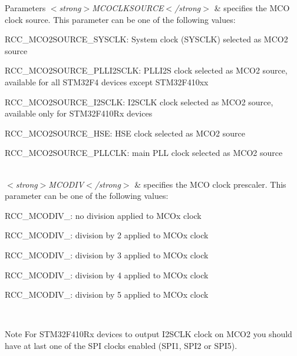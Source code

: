 \begin{DoxyParams}{Parameters}
{\em $<$strong$>$\+M\+C\+O\+C\+L\+K\+S\+O\+U\+R\+C\+E$<$/strong$>$} & specifies the M\+CO clock source. This parameter can be one of the following values\+: \begin{DoxyItemize}
\item R\+C\+C\+\_\+\+M\+C\+O2\+S\+O\+U\+R\+C\+E\+\_\+\+S\+Y\+S\+C\+LK\+: System clock (S\+Y\+S\+C\+LK) selected as M\+C\+O2 source \item R\+C\+C\+\_\+\+M\+C\+O2\+S\+O\+U\+R\+C\+E\+\_\+\+P\+L\+L\+I2\+S\+C\+LK\+: P\+L\+L\+I2S clock selected as M\+C\+O2 source, available for all S\+T\+M32\+F4 devices except S\+T\+M32\+F410xx \item R\+C\+C\+\_\+\+M\+C\+O2\+S\+O\+U\+R\+C\+E\+\_\+\+I2\+S\+C\+LK\+: I2\+S\+C\+LK clock selected as M\+C\+O2 source, available only for S\+T\+M32\+F410\+Rx devices \item R\+C\+C\+\_\+\+M\+C\+O2\+S\+O\+U\+R\+C\+E\+\_\+\+H\+SE\+: H\+SE clock selected as M\+C\+O2 source \item R\+C\+C\+\_\+\+M\+C\+O2\+S\+O\+U\+R\+C\+E\+\_\+\+P\+L\+L\+C\+LK\+: main P\+LL clock selected as M\+C\+O2 source \end{DoxyItemize}
\\
\hline
{\em $<$strong$>$\+M\+C\+O\+D\+I\+V$<$/strong$>$} & specifies the M\+CO clock prescaler. This parameter can be one of the following values\+: \begin{DoxyItemize}
\item R\+C\+C\+\_\+\+M\+C\+O\+D\+I\+V\+\_\+: no division applied to M\+C\+Ox clock \item R\+C\+C\+\_\+\+M\+C\+O\+D\+I\+V\+\_\+: division by 2 applied to M\+C\+Ox clock \item R\+C\+C\+\_\+\+M\+C\+O\+D\+I\+V\+\_\+: division by 3 applied to M\+C\+Ox clock \item R\+C\+C\+\_\+\+M\+C\+O\+D\+I\+V\+\_\+: division by 4 applied to M\+C\+Ox clock \item R\+C\+C\+\_\+\+M\+C\+O\+D\+I\+V\+\_\+: division by 5 applied to M\+C\+Ox clock \end{DoxyItemize}
\\
\hline
\end{DoxyParams}
\begin{DoxyNote}{Note}
For S\+T\+M32\+F410\+Rx devices to output I2\+S\+C\+LK clock on M\+C\+O2 you should have at last one of the S\+PI clocks enabled (S\+P\+I1, S\+P\+I2 or S\+P\+I5). 
\end{DoxyNote}
